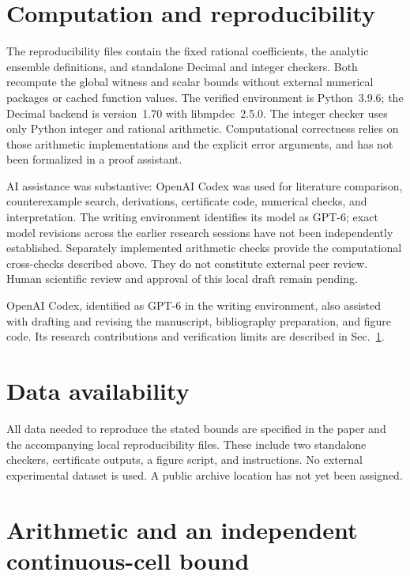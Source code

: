 \documentclass[aps,pra,reprint,amsmath,amssymb,longbibliography,nofootinbib]{revtex4-2}
\begin{document}
\section{Computation and reproducibility}\label{sec:compute}

The reproducibility files contain the fixed rational coefficients, the
analytic ensemble definitions, and standalone Decimal and integer checkers.
Both recompute the global witness and scalar bounds without external
numerical packages or cached function values. The verified
environment is Python~3.9.6; the Decimal backend is version~1.70 with
libmpdec~2.5.0. The integer checker uses only Python integer and rational
arithmetic. Computational correctness relies on those arithmetic
implementations and the explicit error arguments, and has not been
formalized in a proof assistant.

AI assistance was substantive: OpenAI Codex was used for literature
comparison, counterexample search, derivations, certificate code, numerical
checks, and interpretation. The writing environment
identifies its model as GPT-6; exact model revisions across the earlier
research sessions have not been independently established. Separately
implemented arithmetic checks provide the computational cross-checks
described above. They do not constitute external peer review. Human
scientific review and approval of this local draft remain pending.

\begin{acknowledgments}
OpenAI Codex, identified as GPT-6 in the writing environment, also assisted
with drafting and revising the manuscript, bibliography preparation, and
figure code. Its research contributions and verification limits are
described in Sec.~\ref{sec:compute}.
\end{acknowledgments}

\section*{Data availability}
All data needed to reproduce the stated bounds are specified in the paper
and the accompanying local reproducibility files. These include two
standalone checkers, certificate outputs, a figure script, and instructions.
No external experimental dataset is used. A public archive location has not
yet been assigned.

\appendix
\section{Arithmetic and an independent continuous-cell bound}\label{app:arithmetic}
\end{document}
